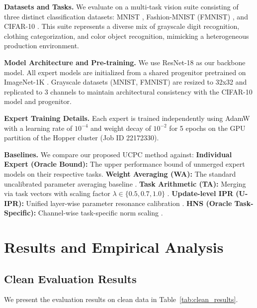 \documentclass{article}
\theoremstyle{plain}
\theoremstyle{definition}
\theoremstyle{remark}
\begin{document}
\textbf{Datasets and Tasks.} We evaluate on a multi-task vision suite consisting of three distinct classification datasets: MNIST \cite{lecun98}, Fashion-MNIST (FMNIST) \cite{xiao17}, and CIFAR-10 \cite{krizhevsky09}. This suite represents a diverse mix of grayscale digit recognition, clothing categorization, and color object recognition, mimicking a heterogeneous production environment.

\textbf{Model Architecture and Pre-training.} We use ResNet-18 \cite{he16} as our backbone model. All expert models are initialized from a shared progenitor pretrained on ImageNet-1K \cite{russakovsky15}. Grayscale datasets (MNIST, FMNIST) are resized to 32x32 and replicated to 3 channels to maintain architectural consistency with the CIFAR-10 model and progenitor.

\textbf{Expert Training Details.} Each expert is trained independently using AdamW \cite{loshchilov17} with a learning rate of $10^{-4}$ and weight decay of $10^{-2}$ for 5 epochs on the GPU partition of the Hopper cluster (Job ID 22172330).

\textbf{Baselines.} We compare our proposed UCPC method against:
\textbf{Individual Expert (Oracle Bound):} The upper performance bound of unmerged expert models on their respective tasks.
\textbf{Weight Averaging (WA):} The standard uncalibrated parameter averaging baseline \cite{wortsman22}.
\textbf{Task Arithmetic (TA):} Merging via task vectors with scaling factor $\lambda \in \{0.5, 0.7, 1.0\}$ \cite{ilharco23}.
\textbf{Update-level IPR (U-IPR):} Unified layer-wise parameter resonance calibration \cite{anonymous26c}.
\textbf{HNS (Oracle Task-Specific):} Channel-wise task-specific norm scaling \cite{anonymous26b}.

\section{Results and Empirical Analysis}
\label{sec:results}

\subsection{Clean Evaluation Results}
We present the evaluation results on clean data in Table~\ref{tab:clean_results}.
\end{document}
